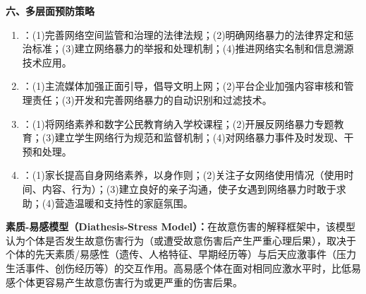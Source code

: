 \begin{keybox}
\textbf{六、多层面预防策略}
\begin{enumerate}[leftmargin=*]
    \item {}：(1)完善网络空间监管和治理的法律法规；(2)明确网络暴力的法律界定和惩治标准；(3)建立网络暴力的举报和处理机制；(4)推进网络实名制和信息溯源技术应用。
    \item {}：(1)主流媒体加强正面引导，倡导文明上网；(2)平台企业加强内容审核和管理责任；(3)开发和完善网络暴力的自动识别和过滤技术。
    \item {}：(1)将网络素养和数字公民教育纳入学校课程；(2)开展反网络暴力专题教育；(3)建立学生网络行为规范和监督机制；(4)对网络暴力事件及时发现、干预和处理。
    \item {}：(1)家长提高自身网络素养，以身作则；(2)关注子女网络使用情况（使用时间、内容、行为）；(3)建立良好的亲子沟通，使子女遇到网络暴力时敢于求助；(4)营造温暖和支持性的家庭氛围。
\end{enumerate}
\end{keybox}

\begin{defbox}
\textbf{素质-易感模型（Diathesis-Stress Model）：}在故意伤害的解释框架中，该模型认为个体是否发生故意伤害行为（或遭受故意伤害后产生严重心理后果），取决于个体的先天素质/易感性（遗传、人格特征、早期经历等）与后天应激事件（压力生活事件、创伤经历等）的交互作用。高易感个体在面对相同应激水平时，比低易感个体更容易产生故意伤害行为或更严重的伤害后果。
\end{defbox}

\newpage

